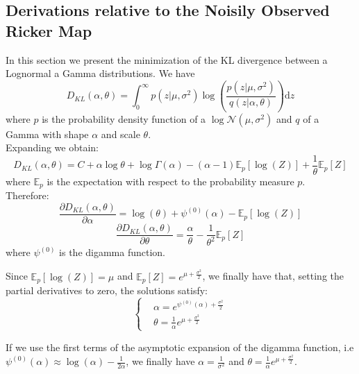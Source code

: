 \documentclass[12pt]{article}
\begin{document}
\clearpage
\begin{appendices}
	\section{Derivations relative to the Noisily Observed Ricker Map} \label{KLRicker}
	In this section we present the minimization of the KL divergence between a Lognormal a Gamma distributions.
	We have
	\begin{equation*}
	D_{KL}(\alpha, \theta) = \int_{0}^{\infty}{p(z|\mu, \sigma^2)\log(\frac{p(z|\mu, \sigma^2)}{q(z|\alpha, \theta)})\mathrm{d}z}
	\end{equation*}
	where $p$ is the probability density function of a $\log\mathcal{N}(\mu, \sigma^2)$ and $q$ of a Gamma with shape $\alpha$ and scale $\theta$. \\
	Expanding we obtain:
	\begin{equation*}
	D_{KL}(\alpha, \theta) = C + \alpha\log\theta + \log\Gamma(\alpha) - (\alpha-1)\mathbb{E}_p[\log(Z)] + \frac{1}{\theta}\mathbb{E}_p[Z]
	\end{equation*}
	where $\mathbb{E}_p$ is the expectation with respect to the probability measure $p$.\\
	Therefore:
	\begin{equation*}
	\frac{\partial D_{KL}(\alpha, \theta)}{\partial \alpha} = \log(\theta) + \psi^{(0)}(\alpha)-\mathbb{E}_p[\log(Z)]
	\end{equation*}
	\begin{equation*}
	\frac{\partial D_{KL}(\alpha, \theta)}{\partial \theta} = \frac{\alpha}{\theta} - \frac{1}{\theta^2}\mathbb{E}_p[Z]
	\end{equation*}
	where $\psi^{(0)}$ is the digamma function.
	
	Since $\mathbb{E}_p[\log(Z)]=\mu$ and $\mathbb{E}_p[Z] = e^{\mu+\frac{\sigma^2}{2}}$, we finally have that, setting the partial derivatives to zero, the solutions satisfy:
	\[	\begin{cases}
	& \alpha=e^{\psi^{(0)}(\alpha)+\frac{\sigma^2}{2}} \\
	& \theta=\frac{1}{\alpha}e^{\mu+\frac{\sigma^2}{2}}
	\end{cases}\]
	
	If we use the first terms of the asymptotic expansion of the digamma function, i.e $\psi^{(0)}(\alpha) \approx \log(\alpha)-\frac{1}{2\alpha}$, we finally have $\alpha =\frac{1}{\sigma^2}$ and $\theta=\frac{1}{\alpha}e^{\mu+\frac{\sigma^2}{2}}$. \\
	

\end{appendices}
\end{document}
